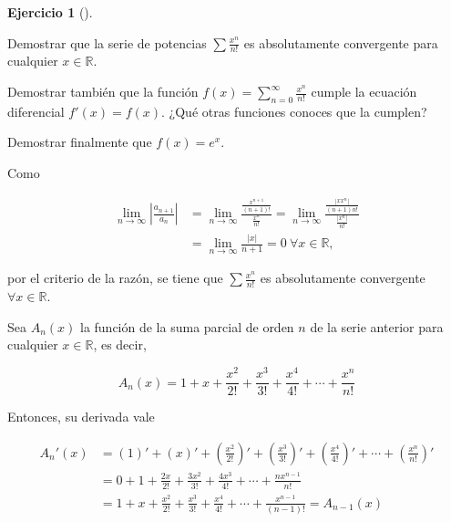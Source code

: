 \documentclass[
  spanish,
  a4paper,
]{scrreport}
\theoremstyle{definition}
\newtheorem{exercise}{Ejercicio}[chapter]
\theoremstyle{remark}
\begin{document}
\begin{exercise}[]\protect\hypertarget{exr-suma-serie-potencias-exponencial}{}\label{exr-suma-serie-potencias-exponencial}

Demostrar que la serie de potencias \(\sum \frac{x^n}{n!}\) es
absolutamente convergente para cualquier \(x\in\mathbb{R}\).

Demostrar también que la función
\(f(x)=\sum_{n=0}^\infty \frac{x^n}{n!}\) cumple la ecuación diferencial
\(f'(x)=f(x)\). ¿Qué otras funciones conoces que la cumplen?

Demostrar finalmente que \(f(x)=e^x\).

\end{exercise}

\begin{tcolorbox}[enhanced jigsaw, arc=.35mm, bottomrule=.15mm, bottomtitle=1mm, breakable, colback=white, colbacktitle=quarto-callout-tip-color!10!white, colframe=quarto-callout-tip-color-frame, coltitle=black, left=2mm, leftrule=.75mm, opacityback=0, opacitybacktitle=0.6, rightrule=.15mm, title=\textcolor{quarto-callout-tip-color}{\faLightbulb}\hspace{0.5em}{Solución}, titlerule=0mm, toprule=.15mm, toptitle=1mm]

Como

\begin{align*}
\lim_{n\to\infty} \left|\frac{a_{n+1}}{a_n}\right| &= \lim_{n\to\infty} \frac{\frac{x^{n+1}}{(n+1)!}}{\frac{x^n}{n!}} = \lim_{n\to\infty} \frac{\frac{|xx^n|}{(n+1)n!}}{\frac{|x^n|}{n!}} \\
& = \lim_{n\to\infty} \frac{|x|}{n+1} = 0 \ \forall x\in\mathbb{R},
\end{align*}

por el criterio de la razón, se tiene que \(\sum \frac{x^n}{n!}\) es
absolutamente convergente \(\forall x\in\mathbb{R}\).

Sea \(A_n(x)\) la función de la suma parcial de orden \(n\) de la serie
anterior para cualquier \(x\in\mathbb{R}\), es decir,

\[
A_n(x) = 1 + x + \frac{x^2}{2!} + \frac{x^3}{3!} + \frac{x^4}{4!} + \cdots +\frac{x^n}{n!}
\]

Entonces, su derivada vale

\begin{align*}
A_n'(x) &= (1)' + (x)' + \left(\frac{x^2}{2!}\right)' + \left(\frac{x^3}{3!}\right)' + \left(\frac{x^4}{4!}\right)' + \cdots + \left(\frac{x^n}{n!}\right)'\\
&= 0 + 1 + \frac{2x}{2!} + \frac{3x^2}{3!} + \frac{4x^3}{4!} + \cdots +\frac{nx^{n-1}}{n!} \\
&=  1 + x + \frac{x^2}{2!} + \frac{x^3}{3!} + \frac{x^4}{4!} + \cdots +\frac{x^{n-1}}{(n-1)!} = A_{n-1}(x)
\end{align*}


\end{tcolorbox}
\end{document}
